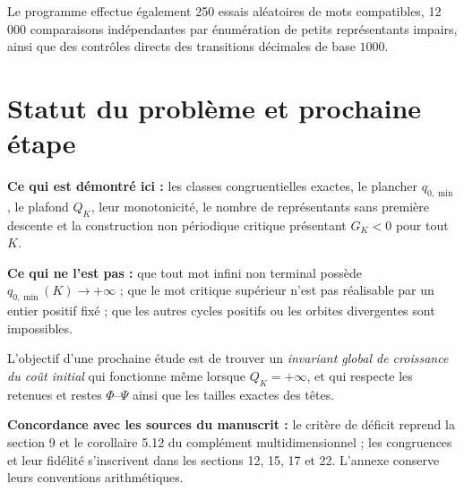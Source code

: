 \documentclass[11pt,a4paper]{article}
\begin{document}
Le programme effectue également 250 essais aléatoires de mots compatibles, 12\,000 comparaisons indépendantes par énumération de petits représentants impairs, ainsi que des contrôles directs des transitions décimales de base $1000$.

\section{Statut du problème et prochaine étape}
\textbf{Ce qui est démontré ici :} les classes congruentielles exactes, le plancher $q_{0,\min}$, le plafond $Q_K$, leur monotonicité, le nombre de représentants sans première descente et la construction non périodique critique présentant $G_K<0$ pour tout $K$.

\textbf{Ce qui ne l'est pas :} que tout mot infini non terminal possède $q_{0,\min}(K)\to+\infty$ ; que le mot critique supérieur n'est pas réalisable par un entier positif fixé ; que les autres cycles positifs ou les orbites divergentes sont impossibles.

L'objectif d'une prochaine étude est de trouver un \emph{invariant global de croissance du coût initial} qui fonctionne même lorsque $Q_K=+\infty$, et qui respecte les retenues et restes $\Phi$--$\Psi$ ainsi que les tailles exactes des têtes.

\textbf{Concordance avec les sources du manuscrit :} le critère de déficit reprend la section 9 et le corollaire 5.12 du complément multidimensionnel ; les congruences et leur fidélité s'inscrivent dans les sections 12, 15, 17 et 22. L'annexe conserve leurs conventions arithmétiques.
\end{document}

